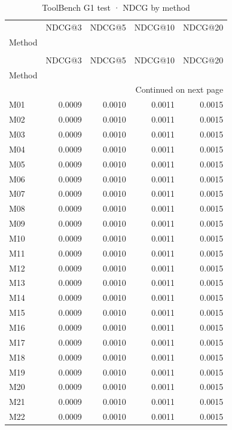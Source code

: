 \begin{longtable}{lrrrr}
\caption{ToolBench G1 test · NDCG by method} \label{tab:ToolBench-G1-test-family-family-ndcg} \\
\toprule
 & NDCG@3 & NDCG@5 & NDCG@10 & NDCG@20 \\
Method &  &  &  &  \\
\midrule
\endfirsthead
\caption[]{ToolBench G1 test · NDCG by method} \\
\toprule
 & NDCG@3 & NDCG@5 & NDCG@10 & NDCG@20 \\
Method &  &  &  &  \\
\midrule
\endhead
\midrule
\multicolumn{5}{r}{Continued on next page} \\
\midrule
\endfoot
\bottomrule
\endlastfoot
M01 & 0.0009 & 0.0010 & 0.0011 & 0.0015 \\
M02 & 0.0009 & 0.0010 & 0.0011 & 0.0015 \\
M03 & 0.0009 & 0.0010 & 0.0011 & 0.0015 \\
M04 & 0.0009 & 0.0010 & 0.0011 & 0.0015 \\
M05 & 0.0009 & 0.0010 & 0.0011 & 0.0015 \\
M06 & 0.0009 & 0.0010 & 0.0011 & 0.0015 \\
M07 & 0.0009 & 0.0010 & 0.0011 & 0.0015 \\
M08 & 0.0009 & 0.0010 & 0.0011 & 0.0015 \\
M09 & 0.0009 & 0.0010 & 0.0011 & 0.0015 \\
M10 & 0.0009 & 0.0010 & 0.0011 & 0.0015 \\
M11 & 0.0009 & 0.0010 & 0.0011 & 0.0015 \\
M12 & 0.0009 & 0.0010 & 0.0011 & 0.0015 \\
M13 & 0.0009 & 0.0010 & 0.0011 & 0.0015 \\
M14 & 0.0009 & 0.0010 & 0.0011 & 0.0015 \\
M15 & 0.0009 & 0.0010 & 0.0011 & 0.0015 \\
M16 & 0.0009 & 0.0010 & 0.0011 & 0.0015 \\
M17 & 0.0009 & 0.0010 & 0.0011 & 0.0015 \\
M18 & 0.0009 & 0.0010 & 0.0011 & 0.0015 \\
M19 & 0.0009 & 0.0010 & 0.0011 & 0.0015 \\
M20 & 0.0009 & 0.0010 & 0.0011 & 0.0015 \\
M21 & 0.0009 & 0.0010 & 0.0011 & 0.0015 \\
M22 & 0.0009 & 0.0010 & 0.0011 & 0.0015 \\

\end{longtable}

